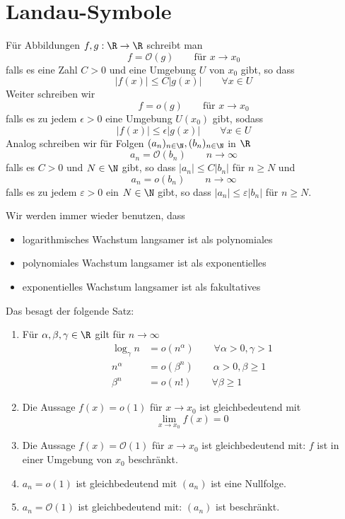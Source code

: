 \documentclass{mycourse}
\begin{document}
\section{Landau-Symbole}
Für Abbildungen $f,g:\R\to\R$ schreibt man
\[
f=\mathcal{O}(g) \qquad \text{für } x\to x_0
\]
falls es eine Zahl $C>0$ und eine Umgebung $U$ von $x_0$ gibt, so dass
\[
|f(x)|\le C|g(x)| \qquad \forall x\in U
\]
Weiter schreiben wir
\[
 \qquad f=o(g) \qquad \text{für } x\to x_0
\]
falls es zu jedem $\epsilon>0$ eine Umgebung $U(x_0)$ gibt, sodass
\[
|f(x)|\le \epsilon |g(x)| \qquad \forall x\in U
\]
Analog schreiben wir für Folgen $(a_n)_{n\in \N}, (b_n)_{n\in \N}$ in $\R$
\[
a_n=\mathcal{O}(b_n) \qquad n\to\infty
\]
falls es $C>0$ und $N\in\N$  gibt, so dass $|a_n|\le C|b_n|$ für $n\ge N$ und
\[
a_n=o(b_n) \qquad n\to\infty
\]
falls es zu jedem $\varepsilon > 0$ ein $N\in\N$ gibt, so dass $|a_n|\le\varepsilon |b_n|$ für $n\ge N$.

Wir werden immer wieder benutzen, dass
\begin{itemize}
\item logarithmisches Wachstum langsamer ist als polynomiales
\item polynomiales Wachstum langsamer ist als exponentielles
\item exponentielles Wachstum langsamer ist als fakultatives
\end{itemize}
Das besagt der folgende Satz:
\begin{st}
\label{st:2.3}
\begin{enumerate}
\item
Für $\alpha, \beta,\gamma\in \R$ gilt für $n\to \infty$
\begin{align*}
\log_\gamma n &=o(n^\alpha) \qquad \forall \alpha>0,\gamma>1\\
n^\alpha &= o(\beta^n)\qquad \alpha>0, \beta\ge1 \\
\beta^n &=o(n!) \qquad \forall \beta\ge 1
\end{align*}
\item
Die  Aussage $f(x)=o(1)$ für $x\to x_0$ ist gleichbedeutend mit
\[
\lim_{x\to x_0}f(x)=0
\]
\item
Die Aussage $f(x)=\mathcal{O}(1)$ für $x\to x_0$ ist gleichbedeutend mit: 
$f$ ist in einer Umgebung von $x_0$ beschränkt.
\item
$a_n=o(1)$ ist gleichbedeutend mit $(a_n)$ ist eine Nullfolge.
\item
$a_n=\mathcal{O}(1)$ ist gleichbedeutend mit: $(a_n)$ ist beschränkt.
\end{enumerate}


\end{st}
\end{document}
